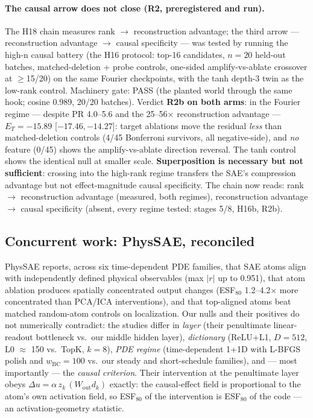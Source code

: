 \documentclass{article}
\newcommand{\ET}{E_T}
\begin{document}
\paragraph{The causal arrow does not close (R2, preregistered and
run).} The H18 chain measures rank $\to$ reconstruction advantage; the
third arrow --- reconstruction advantage $\to$ causal specificity ---
was tested by running the high-n causal battery (the H16 protocol:
top-16 candidates, $n{=}20$ held-out batches, matched-deletion +
probe controls, one-sided amplify-vs-ablate crossover at
$\ge$15/20) on the same Fourier checkpoints, with the tanh depth-3
twin as the low-rank control. Machinery gate: PASS (the planted world
through the same hook; cosine 0.989, 20/20 batches). Verdict
\textbf{R2b on both arms}: in the Fourier regime --- despite PR
4.0--5.6 and the 25--56$\times$ reconstruction advantage ---
$\ET = -15.89$ [$-17.46, -14.27$]: target ablations move the residual
\emph{less} than matched-deletion controls (4/45 Bonferroni survivors,
all negative-side), and \emph{no} feature (0/45) shows the
amplify-vs-ablate direction reversal. The tanh control shows the
identical null at smaller scale. \textbf{Superposition is necessary
but not sufficient}: crossing into the high-rank regime transfers the
SAE's compression advantage but not effect-magnitude causal
specificity. The chain now reads: rank $\to$ reconstruction advantage
(measured, both regimes), reconstruction advantage $\to$ causal
specificity (absent, every regime tested: stages 5/8, H16b, R2b).

\subsection{Concurrent work: PhysSAE, reconciled}
\label{sec:reconciliation}

PhysSAE \cite{patil2026physSAE} reports, across six time-dependent PDE
families, that SAE atoms align with independently defined physical
observables (max $|r|$ up to 0.951), that atom ablation produces spatially
concentrated output changes (ESF$_{80}$ 1.2--4.2$\times$ more
concentrated than PCA/ICA interventions), and that top-aligned atoms
beat matched random-atom controls on localization. Our nulls and their
positives do not numerically contradict: the studies differ in
\emph{layer} (their penultimate linear-readout bottleneck vs.\ our
middle hidden layer), \emph{dictionary} (ReLU+L1, $D{=}512$, L0
$\approx$ 150 vs.\ TopK, $k{=}8$), \emph{PDE regime} (time-dependent
1+1D with L-BFGS polish and $w_{\mathrm{BC}}{=}100$ vs.\ our steady and
short-schedule families), and --- most importantly --- the
\emph{causal criterion}. Their intervention at the penultimate layer
obeys $\Delta u = \alpha\, z_k\, (W_{\mathrm{out}} d_k)$ exactly: the
causal-effect field is proportional to the atom's own activation field,
so ESF$_{80}$ of the intervention is ESF$_{80}$ of the code --- an
activation-geometry statistic.
\end{document}
